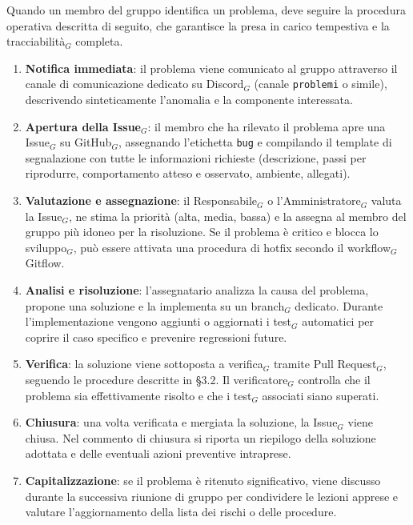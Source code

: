 \documentclass[a4paper, 10pt]{article}
\begin{document}
Quando un membro del gruppo identifica un problema, deve seguire la procedura operativa descritta di seguito, che garantisce la presa in carico tempestiva e la tracciabilità$_G$ completa.

\begin{enumerate}
    \item \textbf{Notifica immediata}: il problema viene comunicato al gruppo attraverso il canale di comunicazione dedicato su Discord$_G$ (canale \texttt{problemi} o simile), descrivendo sinteticamente l'anomalia e la componente interessata.
    
    \item \textbf{Apertura della Issue$_G$}: il membro che ha rilevato il problema apre una Issue$_G$ su GitHub$_G$, assegnando l'etichetta \texttt{bug} e compilando il template di segnalazione con tutte le informazioni richieste (descrizione, passi per riprodurre, comportamento atteso e osservato, ambiente, allegati).
    
    \item \textbf{Valutazione e assegnazione}: il Responsabile$_G$ o l'Amministratore$_G$ valuta la Issue$_G$, ne stima la priorità (alta, media, bassa) e la assegna al membro del gruppo più idoneo per la risoluzione. Se il problema è critico e blocca lo sviluppo$_G$, può essere attivata una procedura di hotfix secondo il workflow$_G$ Gitflow.
    
    \item \textbf{Analisi e risoluzione}: l'assegnatario analizza la causa del problema, propone una soluzione e la implementa su un branch$_G$ dedicato. Durante l'implementazione vengono aggiunti o aggiornati i test$_G$ automatici per coprire il caso specifico e prevenire regressioni future.
    
    \item \textbf{Verifica}: la soluzione viene sottoposta a verifica$_G$ tramite Pull Request$_G$, seguendo le procedure descritte in §3.2. Il verificatore$_G$ controlla che il problema sia effettivamente risolto e che i test$_G$ associati siano superati.
    
    \item \textbf{Chiusura}: una volta verificata e mergiata la soluzione, la Issue$_G$ viene chiusa. Nel commento di chiusura si riporta un riepilogo della soluzione adottata e delle eventuali azioni preventive intraprese.
    
    \item \textbf{Capitalizzazione}: se il problema è ritenuto significativo, viene discusso durante la successiva riunione di gruppo per condividere le lezioni apprese e valutare l'aggiornamento della lista dei rischi o delle procedure.
\end{enumerate}
\end{document}
